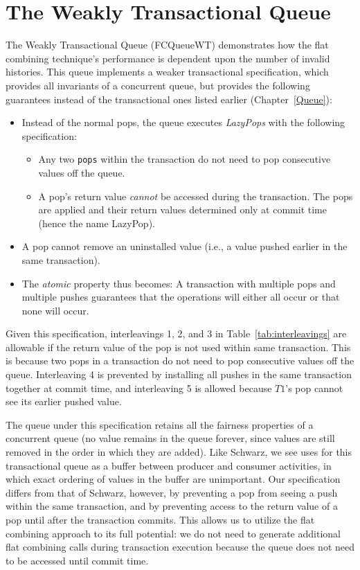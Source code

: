 \section{The Weakly Transactional Queue} 

The Weakly Transactional Queue (FCQueueWT) demonstrates how the flat combining technique's performance is dependent upon the number of invalid histories. This queue implements a weaker transactional specification, which provides all invariants of a concurrent queue, but provides the following guarantees instead of the transactional ones listed earlier (Chapter~\ref{Queue}):
\begin{itemize}
    \item Instead of the normal pops, the queue executes \emph{LazyPops} with the following specification:
        \begin{itemize}
            \item Any two \texttt{pops} within the transaction do not need to pop consecutive values off the queue.
            \item A pop's return value \emph{cannot} be accessed during the transaction. The pops are applied and their return values determined only at commit time (hence the name LazyPop). 
        \end{itemize}
    \item A pop cannot remove an uninstalled value (i.e., a value pushed earlier in the same transaction).
    \item The \emph{atomic} property thus becomes: A transaction with multiple pops and multiple pushes guarantees that the operations will either all occur or that none will occur.
\end{itemize}

Given this specification, interleavings 1, 2, and 3 in Table~\ref{tab:interleavings} are allowable if the return value of the pop is not used within same transaction. This is because two pops in a transaction do not need to pop consecutive values off the queue. Interleaving 4 is prevented by installing all pushes in the same transaction together at commit time, and interleaving 5 is allowed because $T1$'s pop cannot see its earlier pushed value.

The queue under this specification retains all the fairness properties of a concurrent queue (no value remains in the queue forever, since values are still removed in the order in which they are added). Like Schwarz\cite{schwarz}, we see uses for this transactional queue as a buffer between producer and consumer activities, in which exact ordering of values in the buffer are unimportant.
Our specification differs from that of Schwarz\cite{schwarz}, however, by preventing a pop from seeing a push within the same transaction, and by preventing access to the return value of a pop until after the transaction commits. This allows us to utilize the flat combining approach to its full potential: we do not need to generate additional flat combining calls during transaction execution because the queue does not need to be accessed until commit time.

